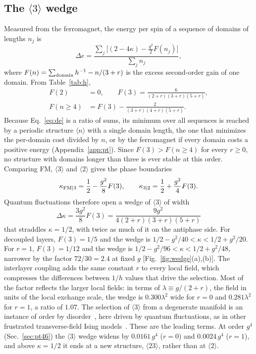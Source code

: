 \documentclass[
 aps,prb,
 twocolumn,
 superscriptaddress,
 longbibliography,
 nofootinbib,
 floatfix
]{revtex4-2}
\begin{document}
\subsection{The $\langle3\rangle$ wedge}
\label{sec:wedge}

Measured from the ferromagnet, the energy per spin of a sequence of domains of lengths $n_j$ is
\begin{equation}
\Delta e=\frac{\sum_j\big[(2-4\kappa)-\tfrac{g^2}{2}F(n_j)\big]}{\sum_jn_j},
\label{eq:de}
\end{equation}
where $F(n)=\sum_{\rm domain}h^{-1}-n/(3+r)$ is the excess second-order gain of one domain. From
Table~\ref{tab:h},
\begin{align}
F(2)&=0,\qquad F(3)=\frac{6}{(2+r)(3+r)(5+r)},\nonumber\\
F(n\ge4)&=F(3)-\frac{2}{(3+r)(4+r)(5+r)} .
\label{eq:F}
\end{align}
Because Eq.~\eqref{eq:de} is a ratio of sums, its minimum over all sequences is reached by a periodic
structure $\langle n\rangle$ with a single domain length, the one that minimizes the per-domain
cost divided by $n$, or by the ferromagnet if every domain costs a positive energy
(Appendix~\ref{app:pt}). Since $F(3)>F(n\ge4)$ for every $r\ge0$, no structure with domains longer
than three is ever stable at this order. Comparing FM, $\langle3\rangle$ and $\langle2\rangle$ gives
the phase boundaries
\begin{equation}
\kappa_{\rm FM|3}=\frac12-\frac{g^2}{8}F(3),\qquad
\kappa_{3|2}=\frac12+\frac{g^2}{4}F(3).
\label{eq:wedge}
\end{equation}
Quantum fluctuations therefore open a wedge of $\langle3\rangle$ of width
\begin{equation}
\Delta\kappa=\frac{3g^2}{8}F(3)=\frac{9g^2}{4(2+r)(3+r)(5+r)}
\label{eq:width}
\end{equation}
that straddles $\kappa=1/2$, with twice as much of it on the antiphase side. For decoupled layers,
$F(3)=1/5$ and the wedge is $1/2-g^2/40<\kappa<1/2+g^2/20$. For $r=1$, $F(3)=1/12$ and the wedge is
$1/2-g^2/96<\kappa<1/2+g^2/48$, narrower by the factor $72/30=2.4$ at fixed $g$ [Fig.~\ref{fig:wedge}(a),(b)]. The
interlayer coupling adds the same constant $r$ to every local field, which compresses the differences between $1/h$
values that drive the selection. Most of the factor reflects the larger local fields: in terms of
$\lambda\equiv g/(2+r)$, the field in units of the local exchange scale, the wedge is $0.300\lambda^2$ wide for $r=0$
and $0.281\lambda^2$ for $r=1$, a ratio of $1.07$. The selection of $\langle3\rangle$ from a degenerate manifold is an instance of
order by disorder~\cite{villain1980order,shender1982antiferromagnetic,henley1989ordering}, here driven by
quantum fluctuations, as in other frustrated transverse-field Ising
models~\cite{moessner2000two,moessner2001ising}. These are the leading terms. At order $g^4$ (Sec.~\ref{sec:pt46}) the
$\langle3\rangle$ wedge widens by $0.0161\,g^4$ ($r=0$) and $0.0024\,g^4$ ($r=1$), and above
$\kappa=1/2$ it ends at a new structure, $\langle23\rangle$, rather than at $\langle2\rangle$.
\end{document}
